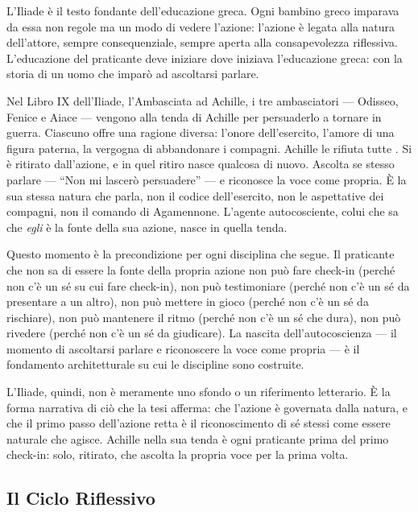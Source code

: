 L'Iliade \`e il testo fondante dell'educazione greca. Ogni bambino greco
imparava da essa non regole ma un modo di vedere l'azione: l'azione \`e
legata alla natura dell'attore, sempre consequenziale, sempre aperta alla
consapevolezza riflessiva. L'educazione del praticante deve iniziare dove
iniziava l'educazione greca: con la storia di un uomo che impar\`o ad
ascoltarsi parlare.

Nel Libro IX dell'Iliade, l'Ambasciata ad Achille, i tre ambasciatori ---
Odisseo, Fenice e Aiace --- vengono alla tenda di Achille per persuaderlo
a tornare in guerra. Ciascuno offre una ragione diversa: l'onore
dell'esercito, l'amore di una figura paterna, la vergogna di abbandonare
i compagni. Achille le rifiuta tutte \parencite[IX]{homer2011iliad}. Si
\`e ritirato dall'azione, e in quel ritiro nasce qualcosa di nuovo.
Ascolta se stesso parlare --- ``Non mi lascer\`o persuadere'' --- e
riconosce la voce come propria. \`E la sua stessa natura che parla, non
il codice dell'esercito, non le aspettative dei compagni, non il comando
di Agamennone. L'agente autocosciente, colui che sa che \emph{egli} \`e
la fonte della sua azione, nasce in quella tenda.

Questo momento \`e la precondizione per ogni disciplina che segue. Il
praticante che non sa di essere la fonte della propria azione non pu\`o
fare check-in (perch\'e non c'\`e un s\'e su cui fare check-in), non
pu\`o testimoniare (perch\'e non c'\`e un s\'e da presentare a un altro),
non pu\`o mettere in gioco (perch\'e non c'\`e un s\'e da rischiare),
non pu\`o mantenere il ritmo (perch\'e non c'\`e un s\'e che dura),
non pu\`o rivedere (perch\'e non c'\`e un s\'e da giudicare). La nascita
dell'autocoscienza --- il momento di ascoltarsi parlare e riconoscere la
voce come propria --- \`e il fondamento architetturale su cui le
discipline sono costruite.

L'Iliade, quindi, non \`e meramente uno sfondo o un riferimento
letterario. \`E la forma narrativa di ci\`o che la tesi afferma: che
l'azione \`e governata dalla natura, e che il primo passo dell'azione
retta \`e il riconoscimento di s\'e stessi come essere naturale che agisce.
Achille nella sua tenda \`e ogni praticante prima del primo check-in:
solo, ritirato, che ascolta la propria voce per la prima volta.

\subsection{Il Ciclo Riflessivo}

